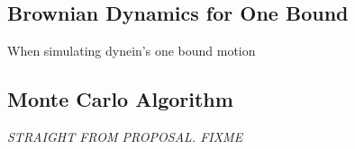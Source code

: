 

\subsection{Brownian Dynamics for One Bound}
\label{sec:BrownianDynamics}

When simulating dynein's one bound motion 





\subsection{Monte Carlo Algorithm}


\textit{STRAIGHT FROM PROPOSAL. FIXME}


